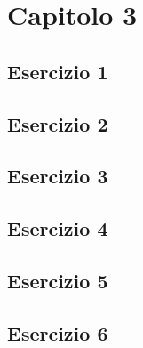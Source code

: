 \section{\textbf{Capitolo 3}}
\subsection{Esercizio 1}

\subsection{Esercizio 2}

\subsection{Esercizio 3}

\subsection{Esercizio 4}

\subsection{Esercizio 5}

\subsection{Esercizio 6}
